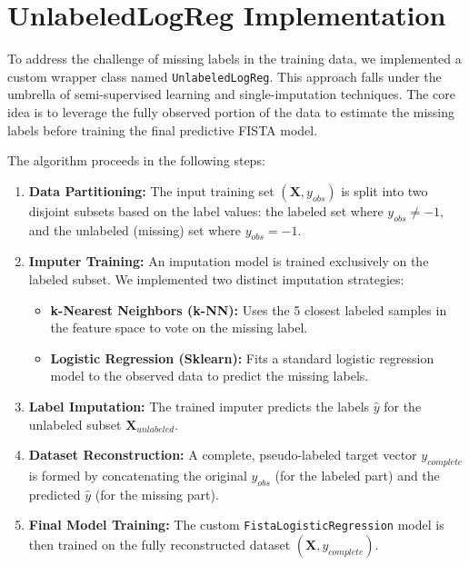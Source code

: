 \documentclass[12pt,a4paper]{article}
\begin{document}
\section{UnlabeledLogReg Implementation}

To address the challenge of missing labels in the training data, we implemented a custom wrapper class named \texttt{UnlabeledLogReg}. This approach falls under the umbrella of semi-supervised learning and single-imputation techniques. The core idea is to leverage the fully observed portion of the data to estimate the missing labels before training the final predictive FISTA model.

The algorithm proceeds in the following steps:
\begin{enumerate}
    \item \textbf{Data Partitioning:} The input training set $(\mathbf{X}, y_{obs})$ is split into two disjoint subsets based on the label values: the labeled set where $y_{obs} \neq -1$, and the unlabeled (missing) set where $y_{obs} = -1$.
    \item \textbf{Imputer Training:} An imputation model is trained exclusively on the labeled subset. We implemented two distinct imputation strategies:
    \begin{itemize}
        \item \textbf{k-Nearest Neighbors (k-NN):} Uses the 5 closest labeled samples in the feature space to vote on the missing label.
        \item \textbf{Logistic Regression (Sklearn):} Fits a standard logistic regression model to the observed data to predict the missing labels.
    \end{itemize}
    \item \textbf{Label Imputation:} The trained imputer predicts the labels $\hat{y}$ for the unlabeled subset $\mathbf{X}_{unlabeled}$.
    \item \textbf{Dataset Reconstruction:} A complete, pseudo-labeled target vector $y_{complete}$ is formed by concatenating the original $y_{obs}$ (for the labeled part) and the predicted $\hat{y}$ (for the missing part).
    \item \textbf{Final Model Training:} The custom \texttt{FistaLogisticRegression} model is then trained on the fully reconstructed dataset $(\mathbf{X}, y_{complete})$.
\end{enumerate}
\end{document}
